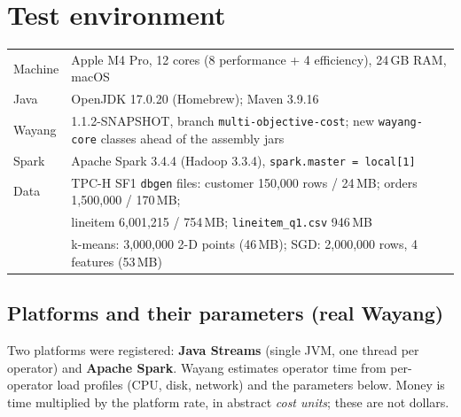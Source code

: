 \documentclass[10pt,a4paper]{article}
\begin{document}
\section{Test environment}

\begin{center}\small
\begin{tabular}{@{}ll@{}}
\toprule
Machine & Apple M4 Pro, 12 cores (8 performance + 4 efficiency), 24\,GB RAM, macOS\\
Java & OpenJDK 17.0.20 (Homebrew); Maven 3.9.16\\
Wayang & 1.1.2-SNAPSHOT, branch \texttt{multi-objective-cost}; new \texttt{wayang-core} classes ahead of the assembly jars\\
Spark & Apache Spark 3.4.4 (Hadoop 3.3.4), \texttt{spark.master = local[1]}\\
Data & TPC-H SF1 \texttt{dbgen} files: customer 150{,}000 rows / 24\,MB; orders 1{,}500{,}000 / 170\,MB;\\
& lineitem 6{,}001{,}215 / 754\,MB; \texttt{lineitem\_q1.csv} 946\,MB\\
& k-means: 3{,}000{,}000 2-D points (46\,MB); SGD: 2{,}000{,}000 rows, 4 features (53\,MB)\\
\bottomrule
\end{tabular}
\end{center}

\subsection{Platforms and their parameters (real Wayang)}
Two platforms were registered: \textbf{Java Streams} (single JVM, one thread per operator) and \textbf{Apache
Spark}. Wayang estimates operator time from per-operator load profiles (CPU, disk, network) and the parameters below.
Money is time multiplied by the platform rate, in abstract \emph{cost units}; these are not dollars.
\end{document}
